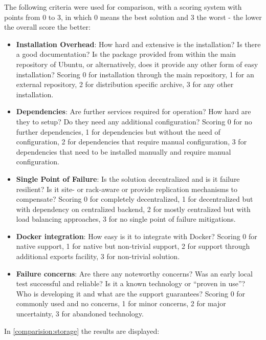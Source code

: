 The following criteria were used for comparison, with a scoring system with points from 0 to 3, in which 0 means the best solution and 3 the worst - the lower the overall score the better:

\begin{itemize}
\item \textbf{Installation Overhead}:
How hard and extensive is the installation?
Is there a good documentation?
Is the package provided from within the main repository of Ubuntu, or alternatively, does it provide any other form of easy installation?
Scoring 0 for installation through the main repository, 1 for an external repository, 2 for distribution specific archive, 3 for any other installation.

\item \textbf{Dependencies}:
Are further services required for operation? 
How hard are they to setup?
Do they need any additional configuration?
Scoring 0 for no further dependencies, 1 for dependencies but without the need of configuration,  2 for dependencies that require manual configuration, 3 for dependencies that need to be installed manually and require manual configuration.

\item \textbf{Single Point of Failure}:
Is the solution decentralized and is it failure resilient?
Is it site- or rack-aware or provide replication mechanisms to compensate?
Scoring 0 for completely decentralized, 1 for decentralized but with dependency on centralized backend, 2 for mostly centralized but with load balancing approaches, 3 for no single point of failure mitigations.

\item \textbf{Docker integration}:
How easy is it to integrate with Docker?
Scoring 0 for native support, 1 for native but non-trivial support, 2 for support through additional exports facility, 3 for non-trivial solution.

\item \textbf{Failure concerns}:
Are there any noteworthy concerns?
Was an early local test successful and reliable?
Is it a known technology or \enquote{proven in use}?
Who is developing it and what are the support guarantees?
Scoring 0 for commonly used and no concerns, 1 for minor concerns, 2 for major uncertainty, 3 for abandoned technology.
\end{itemize}

In \autoref{comparision:storage} the results are displayed:

